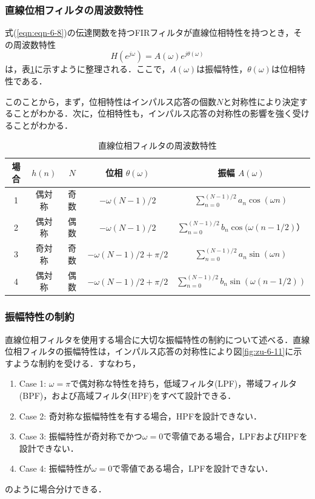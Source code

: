\subsubsection{直線位相フィルタの周波数特性}


式(\ref{eqn:eqn-6-8})の伝達関数を持つFIRフィルタが直線位相特性を持つとき，その周波数特性
\begin{equation}
H(e^{j\omega}) = A(\omega)e^{j\theta (\omega )}
\end{equation}
は，表\ref{table:table-6-21}に示すように整理される．ここで，$A(\omega )$は振幅特性，$\theta (\omega ) $は位相特性である．

このことから，まず，位相特性はインパルス応答の個数$N$と対称性により決定することがわかる．次に，位相特性も，インパルス応答の対称性の影響を強く受けることがわかる．

\begin{table}[H]
\caption{直線位相フィルタの周波数特性}
\label{table:table-6-21}
\begin{center}
\begin{tabular}{|c|c|c|c|c|}
\hline
場合 & $h(n)$ & $N$ & 位相 $\theta (\omega)$ & 振幅 $A(\omega)$ \\
\hline
1 & 偶対称 & 奇数 & $-\omega(N-1)/2$ & $\displaystyle \sum_{n=0}^{(N-1)/2}a_n \cos (\omega n)$ \\
\hline
2 & 偶対称 & 偶数 & $-\omega(N-1)/2$ & $\displaystyle \sum_{n=0}^{(N-1)/2}b_n \cos (\omega (n-1/2)）$ \\
\hline
3 & 奇対称 & 奇数 & $-\omega(N-1)/2+\pi/2$ & $\displaystyle \sum_{n=0}^{(N-1)/2}a_n \sin (\omega n)$ \\
\hline
4 & 偶対称 & 偶数 & $-\omega(N-1)/2+\pi/2$ & $\displaystyle \sum_{n=0}^{(N-1)/2}b_n \sin (\omega (n-1/2))$ \\
\hline
\end{tabular}
\end{center}
\end{table}

\subsubsection{振幅特性の制約}

直線位相フィルタを使用する場合に大切な振幅特性の制約について述べる．直線位相フィルタの振幅特性は，インパルス応答の対称性により図\ref{fig:zu-6-11}に示すような制約を受ける．すなわち，
\begin{enumerate}
\item Case 1: $\omega = \pi$で偶対称な特性を持ち，低域フィルタ(LPF)，帯域フィルタ(BPF)，および高域フィルタ(HPF)をすべて設計できる．
\item Case 2: 奇対称な振幅特性を有する場合，HPFを設計できない．
\item Case 3: 振幅特性が奇対称でかつ$\omega=0$で零値である場合，LPFおよびHPFを設計できない．
\item Case 4: 振幅特性が$\omega=0$で零値である場合，LPFを設計できない．
\end{enumerate}
のように場合分けできる．

